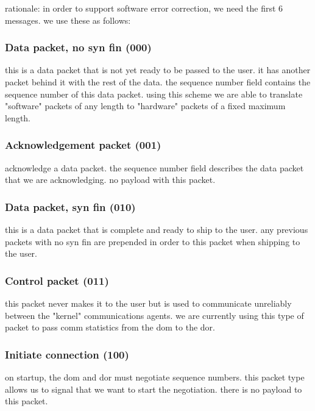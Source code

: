 \documentclass[11pt]{article}
\begin{document}
  rationale: in order to support software error correction,
  we need the first 6 messages.  we use these as follows:

\hypertarget{data-packet-no-syn-fin}{\subsubsection{Data packet, no syn fin (000)}}
	this is a data packet that
         is not yet ready to be passed to the user.  it has
         another packet behind it with the rest of the data.
	 the sequence number field contains the sequence number
         of this data packet.  using this scheme we are able
         to translate "software" packets of any length to
	 "hardware" packets of a fixed maximum length.

\hypertarget{ack-packet}{\subsubsection{Acknowledgement packet (001)}}

	acknowledge a data packet.  the sequence
         number field describes the data packet that we are
         acknowledging.  no payload with this packet.

\hypertarget{data-packet-syn-fin}{\subsubsection{Data packet, syn fin (010)}}
    this is a data packet that
         is complete and ready to ship to the user.  any previous
         packets with no syn fin are prepended in order to this
         packet when shipping to the user.

\hypertarget{control-packet}{\subsubsection{Control packet (011)}}
	 this packet never makes it to the user
         but is used to communicate unreliably between the "kernel"
         communications agents.  we are currently using this type
         of packet to pass comm statistics from the dom to the dor. 

\hypertarget{initiate-connection}{\subsubsection{Initiate connection (100)}}
on startup, the dom and dor must
         negotiate sequence numbers.  this packet type allows us
         to signal that we want to start the negotiation.  there is
         no payload to this packet.
\end{document}
